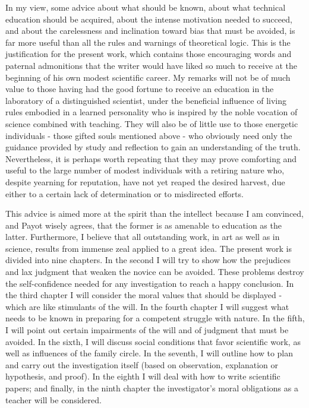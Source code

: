 \documentclass{article}
\begin{document}
In my view, some advice about what should be known, about what technical education should be acquired, about the intense motivation needed to succeed, and about the carelessness and inclination toward bias that must be avoided, is far more useful than all the rules and warnings of theoretical logic. This is the justification for the present work, which contains those encouraging words and paternal admonitions that the writer would have liked so much to receive at the beginning of his own modest scientific career. My remarks will not be of much value to those having had the good fortune to receive an education in the laboratory of a distinguished scientist, under the beneficial influence of living rules embodied in a learned personality who is inspired by the noble vocation of science combined with teaching. They will also be of little use to those energetic individuals - those gifted souls mentioned above -  who obviously need only the guidance provided by study and reflection to gain an understanding of the truth. Nevertheless, it is perhaps worth repeating that they may prove comforting and useful to the large number of modest individuals with a retiring nature who, despite yearning for reputation, have not yet reaped the desired harvest, due either to a certain lack of determination or to misdirected efforts.

This advice is aimed more at the spirit than the intellect because I am convinced, and Payot wisely agrees, that the former is as amenable to education as the latter. Furthermore, I believe that all outstanding work, in art as well as in science, results from immense zeal applied to a great idea. The present work is divided into nine chapters. In the second I will try to show how the prejudices and lax judgment that weaken the novice can be avoided. These problems destroy the self-confidence needed for any investigation to reach a happy conclusion. In the third chapter I will consider the moral values that should be displayed - which are like stimulants of the will. In the fourth chapter I will suggest what needs to be known in preparing for a competent struggle with nature. In the fifth, I will point out certain impairments of the will and of judgment that must be avoided. In the sixth, I will discuss social conditions that favor scientific work, as well as influences of the family circle. In the seventh, I will outline how to plan and carry out the investigation itself (based on observation, explanation or hypothesis, and proof). In the eighth I will deal with how to write scientific papers; and finally, in the ninth chapter the investigator’s moral obligations as a teacher will be considered.
\end{document}
